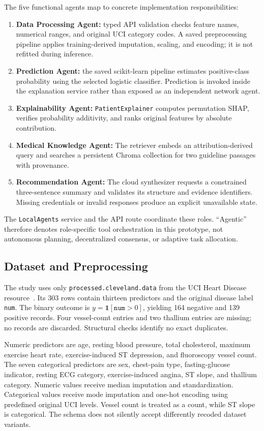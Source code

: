 \documentclass[journal]{IEEEtran}
\begin{document}
The five functional agents map to concrete implementation responsibilities:
\begin{enumerate}
\item \textbf{Data Processing Agent:} typed API validation checks feature names, numerical ranges, and original UCI category codes. A saved preprocessing pipeline applies training-derived imputation, scaling, and encoding; it is not refitted during inference.
\item \textbf{Prediction Agent:} the saved scikit-learn pipeline estimates positive-class probability using the selected logistic classifier. Prediction is invoked inside the explanation service rather than exposed as an independent network agent.
\item \textbf{Explainability Agent:} \texttt{PatientExplainer} computes permutation SHAP, verifies probability additivity, and ranks original features by absolute contribution.
\item \textbf{Medical Knowledge Agent:} The retriever embeds an attribution-derived query and searches a persistent Chroma collection for two guideline passages with provenance.
\item \textbf{Recommendation Agent:} The cloud synthesizer requests a constrained three-sentence summary and validates its structure and evidence identifiers. Missing credentials or invalid responses produce an explicit unavailable state.
\end{enumerate}
The \texttt{LocalAgents} service and the API route coordinate these roles. ``Agentic'' therefore denotes role-specific tool orchestration in this prototype, not autonomous planning, decentralized consensus, or adaptive task allocation.

\subsection{Dataset and Preprocessing}
The study uses only \texttt{processed.cleveland.data} from the UCI Heart Disease resource~\cite{uci}. Its 303 rows contain thirteen predictors and the original disease label \texttt{num}. The binary outcome is $y=\mathbf{1}[\texttt{num}>0]$, yielding 164 negative and 139 positive records. Four vessel-count entries and two thallium entries are missing; no records are discarded. Structural checks identify no exact duplicates.

Numeric predictors are age, resting blood pressure, total cholesterol, maximum exercise heart rate, exercise-induced ST depression, and fluoroscopy vessel count. The seven categorical predictors are sex, chest-pain type, fasting-glucose indicator, resting ECG category, exercise-induced angina, ST slope, and thallium category. Numeric values receive median imputation and standardization. Categorical values receive mode imputation and one-hot encoding using predefined original UCI levels. Vessel count is treated as a count, while ST slope is categorical. The schema does not silently accept differently recoded dataset variants.
\end{document}
